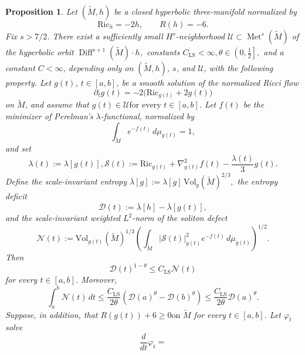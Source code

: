 \documentclass[10pt,a4paper]{amsart}
\newtheorem{proposition}{Proposition}
\begin{document}
\begin{proposition}
\label{LSpath}
Let $(\widetilde M,h)$ be a closed hyperbolic three-manifold normalized by
\[
        \text{Ric}_h=-2h,
        \qquad
        R(h)=-6.
\]
Fix \(s>7/2\). There exist a sufficiently small
\(H^s\)-neighborhood
$\mathcal U
        \subset \operatorname{Met}^{s}(\widetilde M)$
of the hyperbolic orbit
$\operatorname{Diff}^{s+1}(\widetilde M)\cdot h,$
constants
$C_{\mathrm{LS}}<\infty, 
        \theta\in\left(0,\frac12\right],$
and a constant $C<\infty$, depending only on
\((\widetilde M,h)\), \(s\), and \(\mathcal U\), with the following
property. Let \(g(t)\), \(t\in[a,b]\), be a smooth solution of the normalized
Ricci flow
\[
        \partial_tg(t)
        =
        -2\bigl(\text{Ric}_{g(t)}+2g(t)\bigr)
\]
on \(\widetilde M\), and assume that
$g(t)\in\mathcal U 
        \text{for every }t\in[a,b]$.
Let \(f(t)\) be the minimizer of Perelman's \(\lambda\)-functional,
normalized by
\[
        \int_{\widetilde M}
        e^{-f(t)}\,d\mu_{g(t)}=1,
\]
and set
\[
        \lambda(t):=\lambda[g(t)],
\mathcal S(t)
        :=
        \text{Ric}_{g(t)}
        +
        \nabla^2_{g(t)}f(t)
        -
        \frac{\lambda(t)}{3}g(t).
\]
Define the scale-invariant entropy
$\overline\lambda[g]        :=
        \lambda[g]\,
        \text{Vol}_g(\widetilde M)^{2/3},$
the entropy deficit
\[
        \mathcal D(t)
        :=
        \overline\lambda[h]
        -
        \overline\lambda[g(t)],
\]
and the scale-invariant weighted \(L^2\)-norm of the soliton defect
\[
        \mathcal N(t)
        :=
        \text{Vol}_{g(t)}(\widetilde M)^{1/3}
        \left(
        \int_{\widetilde M}
        |\mathcal S(t)|_{g(t)}^2
        e^{-f(t)}\,d\mu_{g(t)}
        \right)^{1/2}.
\]
Then
\begin{equation}
\label{eq:LS-good-component}
        \mathcal D(t)^{1-\theta}
        \leq
        C_{\mathrm{LS}}\mathcal N(t)
\end{equation}
for every \(t\in[a,b]\). Moreover,
\begin{equation}
\label{eq:LS-interval-path}
        \int_a^b\mathcal N(t)\,dt
        \leq
        \frac{C_{\mathrm{LS}}}{2\theta}
        \left(
        \mathcal D(a)^\theta
        -
        \mathcal D(b)^\theta
        \right)
        \leq
        \frac{C_{\mathrm{LS}}}{2\theta}
        \mathcal D(a)^\theta .
\end{equation}
Suppose, in addition, that
$R(g(t))+6\geq0  
        \text{on }\widetilde M
$
for every \(t\in[a,b]\). Let \(\varphi_t\) solve
\[
        \frac{d}{dt}\varphi_t
        =
\]
\end{proposition}
\end{document}
